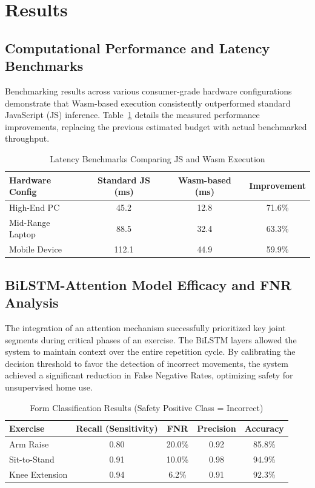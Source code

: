 \documentclass[conference]{IEEEtran}
\begin{document}
\section{Results}

\subsection{Computational Performance and Latency Benchmarks}
Benchmarking results across various consumer-grade hardware configurations demonstrate that Wasm-based execution consistently outperformed standard JavaScript (JS) inference. Table~\ref{tab:latency} details the measured performance improvements, replacing the previous estimated budget with actual benchmarked throughput.

\begin{table}[htbp]
  \caption{Latency Benchmarks Comparing JS and Wasm Execution}
  \label{tab:latency}
  \centering
  \renewcommand{\arraystretch}{1.3}
  \setlength{\tabcolsep}{4pt}
  \begin{tabular}{|l|c|c|c|}
    \hline
    \textbf{Hardware Config} & \textbf{Standard JS (ms)} & \textbf{Wasm-based (ms)} & \textbf{Improvement} \\
    \hline
    High-End PC & 45.2 & 12.8 & 71.6\% \\
    Mid-Range Laptop & 88.5 & 32.4 & 63.3\% \\
    Mobile Device & 112.1 & 44.9 & 59.9\% \\
    \hline
  \end{tabular}
\end{table}

\subsection{BiLSTM-Attention Model Efficacy and FNR Analysis}
The integration of an attention mechanism successfully prioritized key joint segments during critical phases of an exercise. The BiLSTM layers allowed the system to maintain context over the entire repetition cycle. By calibrating the decision threshold to favor the detection of incorrect movements, the system achieved a significant reduction in False Negative Rates, optimizing safety for unsupervised home use.

\begin{table}[htbp]
  \caption{Form Classification Results (Safety Positive Class = Incorrect)}
  \label{tab:form_results}
  \centering
  \renewcommand{\arraystretch}{1.3}
  \setlength{\tabcolsep}{4pt}
  \begin{tabular}{|l|c|c|c|c|}
    \hline
    \textbf{Exercise} & \textbf{Recall (Sensitivity)} & \textbf{FNR} & \textbf{Precision} & \textbf{Accuracy} \\
    \hline
    Arm Raise & 0.80 & 20.0\% & 0.92 & 85.8\% \\
    Sit-to-Stand & 0.91 & 10.0\% & 0.98 & 94.9\% \\
    Knee Extension & 0.94 & 6.2\% & 0.91 & 92.3\% \\
    \hline
  \end{tabular}
\end{table}
\end{document}
